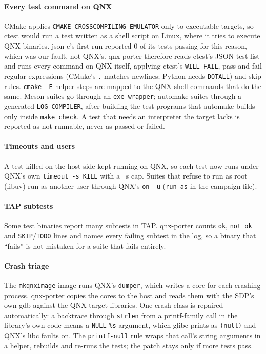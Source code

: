 \documentclass[conference]{IEEEtran}
\begin{document}
\paragraph{Every test command on QNX} CMake applies \texttt{CMAKE\_CROSSCOMPILING\_EMULATOR} only to executable
targets, so ctest would run a test written as a shell script on Linux, where it tries to execute QNX binaries.
json-c's first run reported 0 of its tests passing for this reason, which was our fault, not QNX's. qnx-porter
therefore reads ctest's JSON test list and runs every command on QNX itself, applying ctest's
\texttt{WILL\_FAIL}, pass and fail regular expressions (CMake's \texttt{.} matches newlines; Python needs
\texttt{DOTALL}) and skip rules. \texttt{cmake -E} helper steps are mapped to the QNX shell commands that do the
same. Meson suites go through an \texttt{exe\_wrapper}; automake suites through a generated
\texttt{LOG\_COMPILER}, after building the test programs that automake builds only inside \texttt{make check}.
A test that needs an interpreter the target lacks is reported as not runnable, never as passed or failed.
\paragraph{Timeouts and users} A test killed on the host side kept running on QNX, so each test now runs under
QNX's own \texttt{timeout -s KILL} with a ~s cap. Suites that refuse to run as root (libuv) run as
another user through QNX's \texttt{on -u} (\texttt{run\_as} in the campaign file).
\paragraph{TAP subtests} Some test binaries report many subtests in TAP. qnx-porter counts \texttt{ok},
\texttt{not ok} and \texttt{SKIP}/\texttt{TODO} lines and names every failing subtest in the log, so a binary that
``fails'' is not mistaken for a suite that fails entirely.
\paragraph{Crash triage} The \texttt{mkqnximage} image runs QNX's \texttt{dumper}, which writes a core for each
crashing process. qnx-porter copies the cores to the host and reads them with the SDP's own gdb against the QNX
target libraries. One crash class is repaired automatically: a backtrace through \texttt{strlen} from a
printf-family call in the library's own code means a \texttt{NULL} \texttt{\%s} argument, which glibc prints as
\texttt{(null)} and QNX's libc faults on. The \texttt{printf-null} rule wraps that call's string arguments in a
helper, rebuilds and re-runs the tests; the patch stays only if more tests pass.
\end{document}
